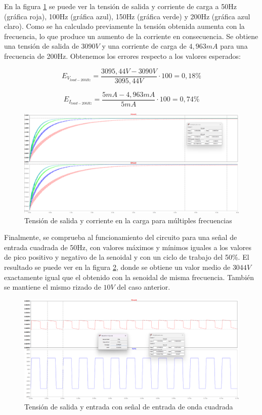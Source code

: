 En la figura \ref{200hz} se puede ver la tensión de salida y corriente de carga a 50Hz (gráfica roja), 100Hz (gráfica azul), 150Hz (gráfica verde)
y 200Hz (gráfica azul claro). Como se ha calculado previamente la tensión obtenida aumenta con la frecuencia, lo que produce un aumento de la corriente en consecuencia.
Se obtiene una tensión de salida de $3090V$ y una corriente de carga de $4,963mA$ para una frecuencia de 200Hz. Obtenemos los errores respecto a los valores esperados:

\begin{equation}
    E_{V_{load-200Hz}} = \frac{3095,44V - 3090V}{3095,44V} \cdot 100 = 0,18\%
\end{equation}

\begin{equation}
    E_{I_{load-200Hz}} = \frac{5mA - 4,963mA}{5mA} \cdot 100 = 0,74\%
\end{equation}

\begin{figure}[H]
    \centering
    \includegraphics[width=1\textwidth]{Imagenes_alvaro/200hz.png}
    \caption{Tensión de salida y corriente en la carga para múltiples frecuencias}
    \label{200hz}
\end{figure}

Finalmente, se comprueba al funcionamiento del circuito para una señal de entrada cuadrada de 50Hz, con valores máximos y mínimos iguales a los valores
de pico positivo y negativo de la senoidal y con un ciclo de trabajo del 50\%. El resultado se puede ver en la figura \ref{cuadrada}, donde se obtiene
un valor medio de $3044V$ exactamente igual que el obtenido con la senoidal de misma frecuencia. También se mantiene el mismo rizado de $10V$ del caso anterior.

\begin{figure}[H]
    \centering
    \includegraphics[width=1\textwidth]{Imagenes_alvaro/cuadrada.png}
    \caption{Tensión de salida y entrada con señal de entrada de onda cuadrada}
    \label{cuadrada}
\end{figure}
